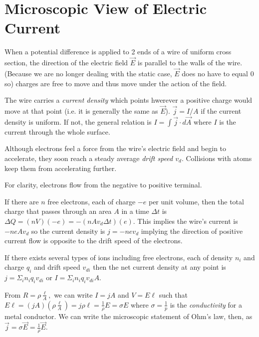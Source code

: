 \section{Microscopic View of Electric Current}

\begin{remark}
    When a potential difference is applied to 2 ends of a wire of uniform cross section, the direction of the electric field $\vec{E}$ is parallel to the walls of the wire. (Because we are no longer dealing with the static case, $\vec{E}$ does no have to equal 0 so) charges are free to move and thus move under the action of the field.
\end{remark}
\begin{definition}
    The wire carries a \emph{current density} which points hwerever a positive charge would move at that point (i.e. it is generally the same as $\vec{E}$). $\vec{j} = I/A$ if the current density is uniform. If not, the general relation is $I = \int \vec{j}\cdot d\vec{A}$ where $I$ is the current through the whole surface.
\end{definition}
\begin{definition}
    Although electrons feel a force from the wire's electric field and begin to accelerate, they soon reach a steady average \emph{drift speed $v_d$}. Collisions with atoms keep them from accelerating further. 
\end{definition}
\begin{note}
    For clarity, electrons flow from the negative to positive terminal.
\end{note}
\begin{remark}
    If there are $n$ free electrons, each of charge $-e$ per unit volume, then the total charge that passes through an area $A$ in a time $\Delta t$ is $\Delta Q = (nV)(-e) = -(nAv_d\Delta t)(e).$ This implies the wire's current is $-neAv_d$ so the current density is $j = -nev_d$ implying the direction of positive current flow is opposite to the drift speed of the electrons. 

    If there exists several types of ions including free electrons, each of density $n_i$ and charge $q_i$ and drift speed $v_{di}$ then the net current density at any point is $j = \Sigma_i n_iq_iv_{di}$ or $I = \Sigma_i n_iq_iv_{di}A$.
\end{remark}
\begin{remark}[Conductivity]
    From $R = \rho\frac{\ell}{A},$ we can write $I = jA$ and $V = E\ell$ such that $E\ell = (jA)(\rho\frac{\ell}{A}) = j\rho\ell = \frac{1}{\rho}E = \sigma E$ where $\sigma = \frac{1}{p}$ is the \emph{conductivity} for a metal conductor. We can write the microscopic statement of Ohm's law, then, as $\vec{j}=\sigma\vec{E}=\frac{1}{\rho}\vec{E}.$
\end{remark}

